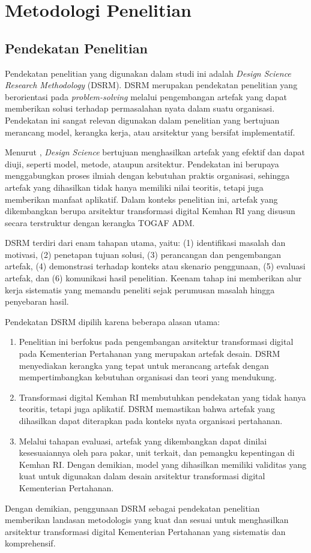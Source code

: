 \section{Metodologi Penelitian}

\subsection{Pendekatan Penelitian}
Pendekatan penelitian yang digunakan dalam studi ini adalah \textit{Design Science Research Methodology} (DSRM).
DSRM merupakan pendekatan penelitian yang berorientasi pada \textit{problem-solving} melalui pengembangan artefak yang dapat memberikan solusi terhadap permasalahan nyata dalam suatu organisasi.
Pendekatan ini sangat relevan digunakan dalam penelitian yang bertujuan merancang model, kerangka kerja, atau arsitektur yang bersifat implementatif.

Menurut \textcite{Hevner2004}, \textit{Design Science} bertujuan menghasilkan artefak yang efektif dan dapat diuji, seperti model, metode, ataupun arsitektur.
Pendekatan ini berupaya menggabungkan proses ilmiah dengan kebutuhan praktis organisasi, sehingga artefak yang dihasilkan tidak hanya memiliki nilai teoritis, tetapi juga memberikan manfaat aplikatif.
Dalam konteks penelitian ini, artefak yang dikembangkan berupa arsitektur transformasi digital Kemhan RI yang disusun secara terstruktur dengan kerangka TOGAF ADM.

DSRM terdiri dari enam tahapan utama, yaitu: (1) identifikasi masalah dan motivasi, (2) penetapan tujuan solusi, (3) perancangan dan pengembangan artefak, (4) demonstrasi terhadap konteks atau skenario penggunaan, (5) evaluasi artefak, dan (6) komunikasi hasil penelitian.
Keenam tahap ini memberikan alur kerja sistematis yang memandu peneliti sejak perumusan masalah hingga penyebaran hasil.

Pendekatan DSRM dipilih karena beberapa alasan utama:
\begin{enumerate}
  \item Penelitian ini berfokus pada pengembangan arsitektur transformasi digital pada Kementerian Pertahanan yang merupakan artefak desain.
  DSRM menyediakan kerangka yang tepat untuk merancang artefak dengan mempertimbangkan kebutuhan organisasi dan teori yang mendukung.
  \item Transformasi digital Kemhan RI membutuhkan pendekatan yang tidak hanya teoritis, tetapi juga aplikatif.
  DSRM memastikan bahwa artefak yang dihasilkan dapat diterapkan pada konteks nyata organisasi pertahanan.
  \item Melalui tahapan evaluasi, artefak yang dikembangkan dapat dinilai kesesuaiannya oleh para pakar, unit terkait, dan pemangku kepentingan di Kemhan RI.
  Dengan demikian, model yang dihasilkan memiliki validitas yang kuat untuk digunakan dalam desain arsitektur transformasi digital Kementerian Pertahanan.
\end{enumerate}
Dengan demikian, penggunaan DSRM sebagai pendekatan penelitian memberikan landasan metodologis yang kuat dan sesuai untuk menghasilkan arsitektur transformasi digital Kementerian Pertahanan yang sistematis dan komprehensif.

